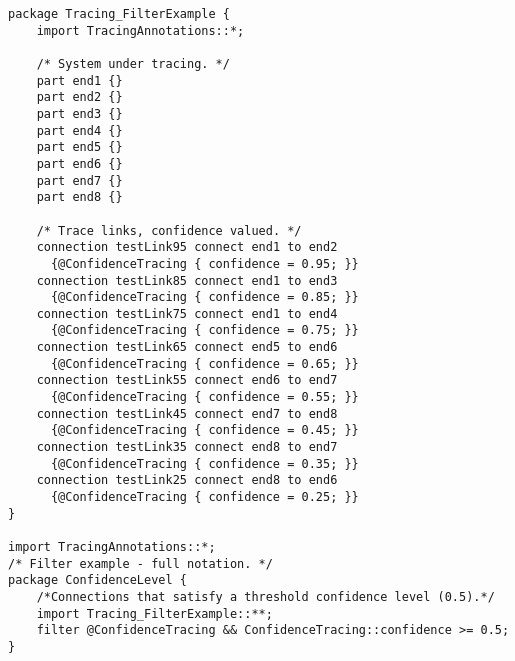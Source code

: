 \begin{lstlisting}[caption={Definition and filtering of tracing annotations to collect links satisfying a certain level of confidence.},
label=lst:filter,
style=mystylesysml,
linewidth=16cm,
xleftmargin=1.7cm,
morekeywords={part,filter}]
package Tracing_FilterExample {
	import TracingAnnotations::*;
	
	/* System under tracing. */
	part end1 {}
	part end2 {}
	part end3 {}
	part end4 {}
	part end5 {}
	part end6 {}
	part end7 {}
	part end8 {}
	
	/* Trace links, confidence valued. */
	connection testLink95 connect end1 to end2 
	  {@ConfidenceTracing { confidence = 0.95; }}
	connection testLink85 connect end1 to end3 
	  {@ConfidenceTracing { confidence = 0.85; }}
	connection testLink75 connect end1 to end4 
	  {@ConfidenceTracing { confidence = 0.75; }}
	connection testLink65 connect end5 to end6 
	  {@ConfidenceTracing { confidence = 0.65; }}
	connection testLink55 connect end6 to end7 
	  {@ConfidenceTracing { confidence = 0.55; }}
	connection testLink45 connect end7 to end8 
	  {@ConfidenceTracing { confidence = 0.45; }}
	connection testLink35 connect end8 to end7 
	  {@ConfidenceTracing { confidence = 0.35; }}
	connection testLink25 connect end8 to end6 
	  {@ConfidenceTracing { confidence = 0.25; }}
}

import TracingAnnotations::*;
/* Filter example - full notation. */
package ConfidenceLevel {
	/*Connections that satisfy a threshold confidence level (0.5).*/
    import Tracing_FilterExample::**;
    filter @ConfidenceTracing && ConfidenceTracing::confidence >= 0.5;
}
\end{lstlisting}
